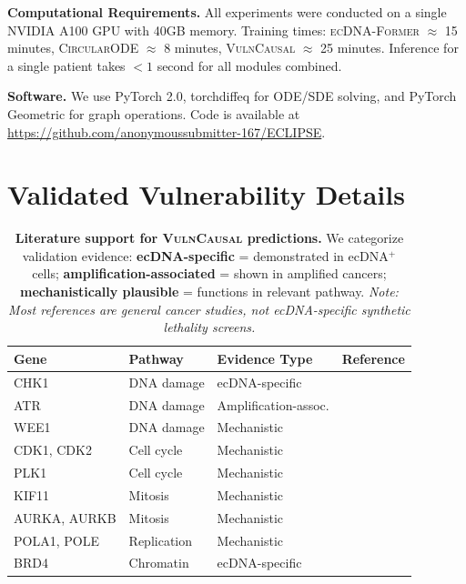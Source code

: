 \documentclass{article}
\newcommand{\former}{\textsc{ecDNA-Former}}
\newcommand{\circularode}{\textsc{CircularODE}}
\newcommand{\vulncausal}{\textsc{VulnCausal}}
\begin{document}
\textbf{Computational Requirements.} All experiments were conducted on a single NVIDIA A100 GPU with 40GB memory. Training times: \former{} $\approx$ 15 minutes, \circularode{} $\approx$ 8 minutes, \vulncausal{} $\approx$ 25 minutes. Inference for a single patient takes $<1$ second for all modules combined.

\textbf{Software.} We use PyTorch 2.0, torchdiffeq for ODE/SDE solving, and PyTorch Geometric for graph operations. Code is available at \url{https://github.com/anonymoussubmitter-167/ECLIPSE}.


\section{Validated Vulnerability Details}
\label{app:vulnerabilities}

\begin{table}[h]
\caption{\textbf{Literature support for \vulncausal{} predictions.} We categorize validation evidence: \textbf{ecDNA-specific} = demonstrated in ecDNA$^+$ cells; \textbf{amplification-associated} = shown in amplified cancers; \textbf{mechanistically plausible} = functions in relevant pathway. \textit{Note: Most references are general cancer studies, not ecDNA-specific synthetic lethality screens.}}
\label{tab:vuln_full}
\centering
\small
\begin{tabular}{@{}llll@{}}
\toprule
Gene & Pathway & Evidence Type & Reference \\
\midrule
CHK1 & DNA damage & ecDNA-specific & \citet{yi_2024_chk1_ecdna} \\
ATR & DNA damage & Amplification-assoc. & \citet{shen_2019_atr} \\
WEE1 & DNA damage & Mechanistic & \citet{otto_2017_cell_cycle} \\
CDK1, CDK2 & Cell cycle & Mechanistic & \citet{otto_2017_cell_cycle} \\
PLK1 & Cell cycle & Mechanistic & \citet{gutteridge_2016_plk1} \\
KIF11 & Mitosis & Mechanistic & \citet{zhou_2021_kif11} \\
AURKA, AURKB & Mitosis & Mechanistic & \citet{wilkinson_2007_aurkb} \\
POLA1, POLE & Replication & Mechanistic & \citet{macheret_2020_replication} \\
BRD4 & Chromatin & ecDNA-specific & \citet{hung_2021_ecdna_hubs} \\
\bottomrule
\end{tabular}
\end{table}
\end{document}
